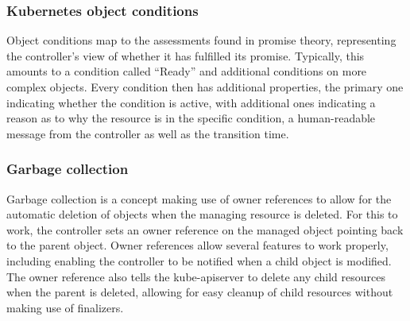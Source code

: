 \subsubsection{Kubernetes object conditions}

Object conditions map to the assessments found in promise theory, representing the controller's view of whether it has fulfilled its promise.
Typically, this amounts to a condition called \enquote{Ready} and additional conditions on more complex objects.
Every condition then has additional properties, the primary one indicating whether the condition is active, with additional ones indicating a reason as to why the resource is in the specific condition, a human-readable message from the controller as well as the transition time.
\parencite{kubebuilder-book}

\subsubsection{Garbage collection}
Garbage collection is a concept making use of owner references to allow for the automatic deletion of objects when the managing resource is deleted.
For this to work, the controller sets an owner reference on the managed object pointing back to the parent object.
Owner references allow several features to work properly, including enabling the controller to be notified when a child object is modified.
The owner reference also tells the kube-apiserver to delete any child resources when the parent is deleted, allowing for easy cleanup of child resources without making use of finalizers.
\parencite{k8sgarbagecollection}
